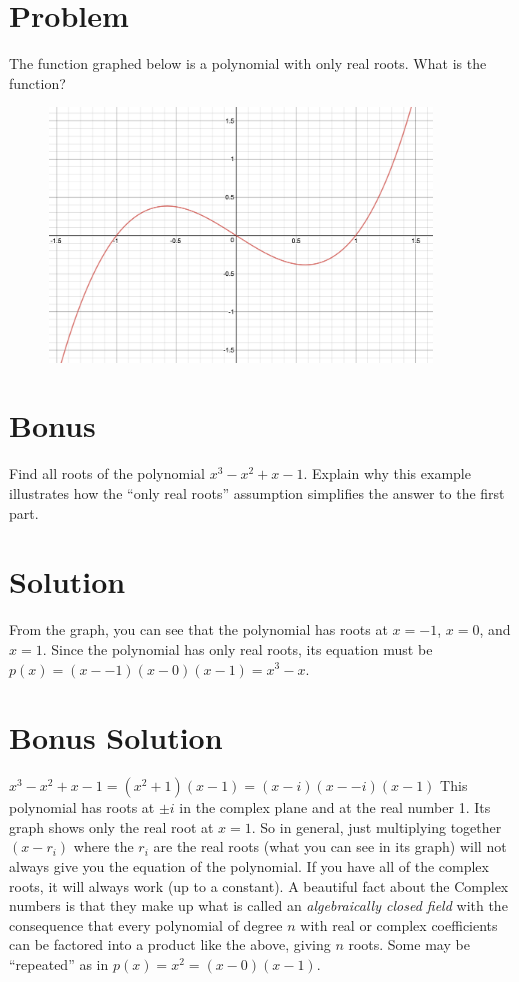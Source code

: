 \documentclass[11pt,a4paper]{report}
\theoremstyle{plain}
\theoremstyle{definition}
\theoremstyle{remark}
\begin{document}
\section*{Problem}
The function graphed below is a polynomial with only real roots. What is the function?
\begin{figure}[h!]
  \includegraphics[width=4in]{poly.png}
  {\caption*{}}
  \label{}
\end{figure}
\section*{Bonus}
Find all roots of the polynomial $x^3-x^2+x-1$.  Explain why this example illustrates how the ``only real roots'' assumption simplifies the answer to the first part.

\newpage
\section*{Solution}
From the graph, you can see that the polynomial has roots at $x=-1$, $x=0$, and $x=1$.  Since the polynomial has only real roots, its equation must be $p(x) = (x - - 1)(x - 0)(x - 1) = x^3 - x$.

\section*{Bonus Solution}
$x^3 - x^2 + x - 1 = (x^2 + 1)(x - 1) = (x - i)(x -- i)(x - 1)$
This polynomial has roots at $\pm i$ in the complex plane and at the real number 1.  Its graph shows only the real root at $x = 1$.  So in general, just multiplying together $(x - r_i)$ where the $r_i$ are the real roots (what you can see in its graph) will not always give you the equation of the polynomial.  If you have all of the complex roots, it will always work (up to a constant). A beautiful fact about the Complex numbers is that they make up what is called an \textit{algebraically closed field} with the consequence that every polynomial of degree $n$ with real or complex coefficients can be factored into a product like the above, giving $n$ roots.  Some may be ``repeated'' as in $p(x) = x^2 = (x - 0)(x - 1)$.
\end{document}
